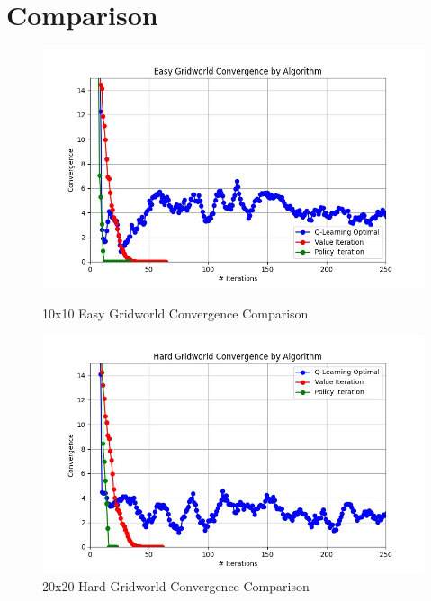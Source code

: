 \documentclass[h]{article}
\begin{document}
\section*{Comparison}

  \begin{figure}[H]
   \endminipage\hfill
      \includegraphics[width=1\textwidth,keepaspectratio]{easy_convergence.jpg} 
      \caption*{10x10 Easy Gridworld Convergence Comparison} 
   \endminipage\hfill
      \includegraphics[width=1\textwidth,keepaspectratio]{hard_convergence.jpg} 
      \caption*{20x20 Hard Gridworld Convergence Comparison} 
   \endminipage\hfill
   \endminipage\hfill
\end{figure}
\end{document}
